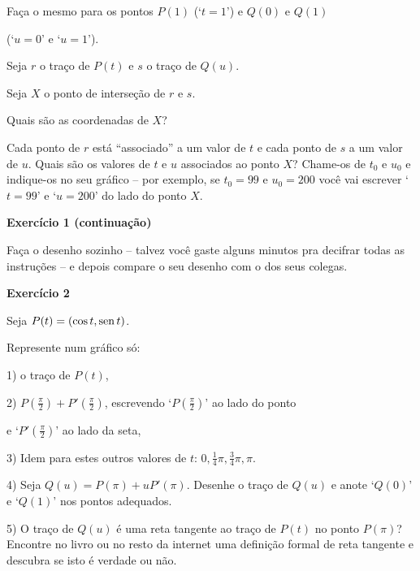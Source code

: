 \documentclass[oneside,12pt]{article}
\begin{document}
Faça o mesmo para os pontos $P(1)$ (`$t=1$') e $Q(0)$ e $Q(1)$

(`$u=0$' e `$u=1$'). 

\msk

Seja $r$ o traço de $P(t)$ e $s$ o traço de $Q(u)$.

Seja $X$ o ponto de interseção de $r$ e $s$.

Quais são as coordenadas de $X$?

\msk

Cada ponto de $r$ está ``associado'' a um valor de $t$ e cada ponto de
$s$ a um valor de $u$. Quais são os valores de $t$ e $u$ associados ao
ponto $X$? Chame-os de $t_0$ e $u_0$ e indique-os no seu gráfico --
por exemplo, se $t_0=99$ e $u_0=200$ você vai escrever `$t=99$' e
`$u=200$' do lado do ponto $X$.

\newpage

{\bf Exercício 1 (continuação)}

Faça o desenho sozinho -- talvez você gaste alguns minutos pra
decifrar todas as instruções -- e depois compare o seu desenho com o
dos seus colegas.


\newpage


{\bf Exercício 2}

Seja $P(t) = (\cos t, \operatorname{sen} t)$.

Represente num gráfico só:

1) o traço de $P(t)$,

2) $P(\frac{π}{2}) + P'(\frac{π}{2})$, escrevendo `$P(\frac{π}{2})$'
ao lado do ponto

e `$P'(\frac{π}{2})$' ao lado da seta,

3) Idem para estes outros valores de $t$: $0, \frac14π, \frac34π, π$.

4) Seja $Q(u) = P(π) + uP'(π)$. Desenhe o traço de $Q(u)$ e anote
`$Q(0)$' e `$Q(1)$' nos pontos adequados.

\msk

5) O traço de $Q(u)$ é uma reta tangente ao traço de $P(t)$ no ponto
$P(π)$? Encontre no livro ou no resto da internet uma definição formal
de reta tangente e descubra se isto é verdade ou não.


\newpage

\end{document}
